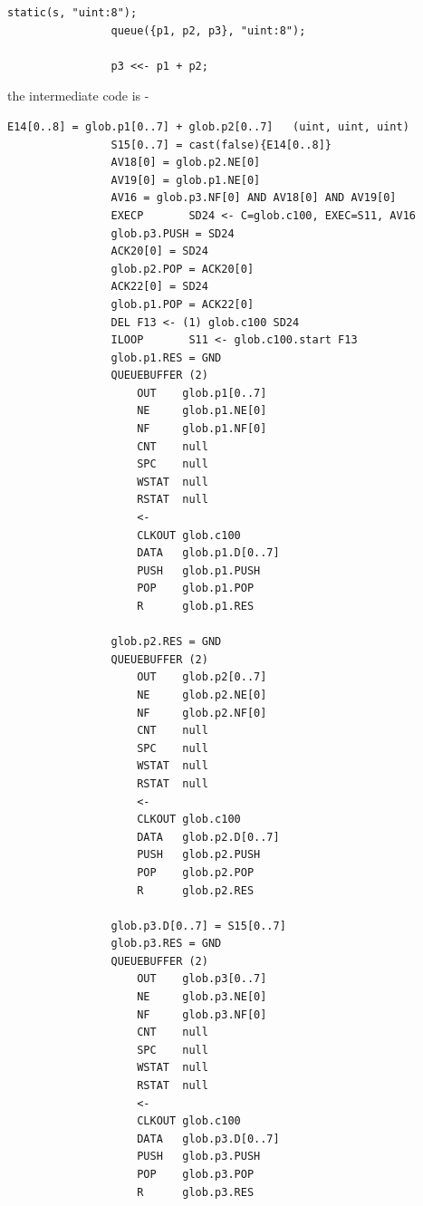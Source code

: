 \documentclass[10pt,a4paper,twoside,fleqn]{book}
\begin{document}
            \begin{lstlisting}[gobble=12, language=threepl]
                static(s, "uint:8");
                queue({p1, p2, p3}, "uint:8");

                p3 <<- p1 + p2;
            \end{lstlisting}
            the intermediate code is -
            \begin{lstlisting}[gobble=12, language=tde]
                E14[0..8] = glob.p1[0..7] + glob.p2[0..7]   (uint, uint, uint)
                S15[0..7] = cast(false){E14[0..8]}
                AV18[0] = glob.p2.NE[0]
                AV19[0] = glob.p1.NE[0]
                AV16 = glob.p3.NF[0] AND AV18[0] AND AV19[0]
                EXECP       SD24 <- C=glob.c100, EXEC=S11, AV16
                glob.p3.PUSH = SD24
                ACK20[0] = SD24
                glob.p2.POP = ACK20[0]
                ACK22[0] = SD24
                glob.p1.POP = ACK22[0]
                DEL F13 <- (1) glob.c100 SD24
                ILOOP       S11 <- glob.c100.start F13
                glob.p1.RES = GND
                QUEUEBUFFER (2)
                    OUT    glob.p1[0..7]
                    NE     glob.p1.NE[0]
                    NF     glob.p1.NF[0]
                    CNT    null
                    SPC    null
                    WSTAT  null
                    RSTAT  null
                    <-
                    CLKOUT glob.c100
                    DATA   glob.p1.D[0..7]
                    PUSH   glob.p1.PUSH
                    POP    glob.p1.POP
                    R      glob.p1.RES

                glob.p2.RES = GND
                QUEUEBUFFER (2)
                    OUT    glob.p2[0..7]
                    NE     glob.p2.NE[0]
                    NF     glob.p2.NF[0]
                    CNT    null
                    SPC    null
                    WSTAT  null
                    RSTAT  null
                    <-
                    CLKOUT glob.c100
                    DATA   glob.p2.D[0..7]
                    PUSH   glob.p2.PUSH
                    POP    glob.p2.POP
                    R      glob.p2.RES

                glob.p3.D[0..7] = S15[0..7]
                glob.p3.RES = GND
                QUEUEBUFFER (2)
                    OUT    glob.p3[0..7]
                    NE     glob.p3.NE[0]
                    NF     glob.p3.NF[0]
                    CNT    null
                    SPC    null
                    WSTAT  null
                    RSTAT  null
                    <-
                    CLKOUT glob.c100
                    DATA   glob.p3.D[0..7]
                    PUSH   glob.p3.PUSH
                    POP    glob.p3.POP
                    R      glob.p3.RES
            \end{lstlisting}
\end{document}
